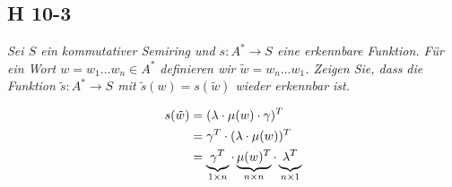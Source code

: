 \documentclass{scrartcl}
\begin{document}
\subsection{H 10-3}

\textsl{Sei $S$ ein kommutativer Semiring und $s: A^* \rightarrow S$ eine erkennbare Funktion. Für ein Wort $w = w_1 \ldots w_n \in A^*$ definieren wir $\tilde{w} = w_n \ldots w_1$. Zeigen Sie, dass die Funktion $\tilde{s} : A^* \rightarrow S$ mit $\tilde{s}(w) = s(\tilde{w})$ wieder erkennbar ist.}

\begin{align*}
    s(\tilde{w}) &= (\lambda \cdot \mu(w) \cdot \gamma)^T\\
                 &= \gamma^T \cdot (\lambda \cdot \mu(w))^T\\
                 &= \underbrace{\gamma^T \vphantom{\mu(w)^T}}_{1 \times n} \cdot \underbrace{\mu(w)^T}_{n \times n} \cdot \underbrace{\lambda^T \vphantom{\mu(w)^T}}_{n \times 1}\\
\end{align*}
\end{document}
